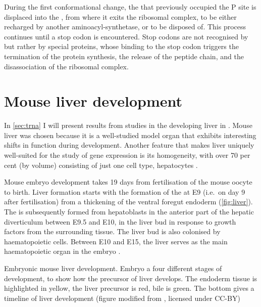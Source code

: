 During the first conformational change, the \trna that previously occupied the P
site is displaced into the , from where it exits the ribosomal
complex, to be either recharged by another aminoacyl-\trna synthetase, or to be
disposed of. This process continues until a stop codon is encountered. Stop
codons are not recognised by \trna[s] but rather by special proteins, whose
binding to the stop codon triggers the termination of the protein synthesis, the
release of the peptide chain, and the disassociation of the ribosomal complex.




\section{Mouse liver development}

In \cref{sec:trna} I will present results from studies in the developing liver
in \mmu. Mouse liver was chosen because it is a well-studied model organ that
exhibits interesting shifts in function during development. Another feature that
makes liver uniquely well-suited for the study of gene expression is its
homogeneity, with over \num{70} per cent (by volume) consisting of just one
cell type, hepatocytes \citep{Si-Tayeb:2010}.

Mouse embryo development takes \num{19} days from fertilisation of the mouse
oocyte to birth. Liver formation starts with the formation of the
 at E9 (i.e.\ on day \num{9} after fertilisation)
from a thickening of the ventral foregut endoderm (\cref{fig:liver}). The
 is subsequently formed from hepatoblasts in the anterior part
of the hepatic diverticulum between E9.5 and E10,  in the liver bud in response
to growth factors from the surrounding tissue. The liver bud is also colonised
by haematopoietic cells. Between E10 and E15, the liver serves as the main
haematopoietic organ in the embryo \citep{Zorn:2008}.

    {Embryonic mouse liver development.}
    {Embryo a four different stages of development, to show how the precursor of
    liver develops. The endoderm tissue is highlighted in yellow, the liver
    precursor is red, bile is green. The bottom gives a timeline of liver
    development (figure modified from \citet{Zorn:2008}, licensed under CC-BY)}

